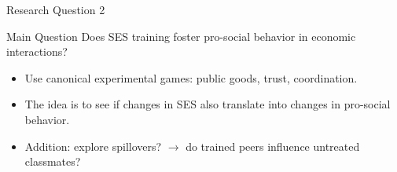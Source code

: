 \documentclass{beamer}
\begin{document}
\begin{frame}{Research Question 2}
    \begin{block}{Main Question}
        Does SES training foster pro-social behavior in economic interactions?
    \end{block}
    \begin{itemize}
        \item Use canonical experimental games: public goods, trust, coordination.
        \item The idea is to see if changes in SES also translate into changes in pro-social behavior. 
        \item Addition: explore spillovers? $\rightarrow$ do trained peers influence untreated classmates?
    \end{itemize}
\end{frame}
\end{document}
